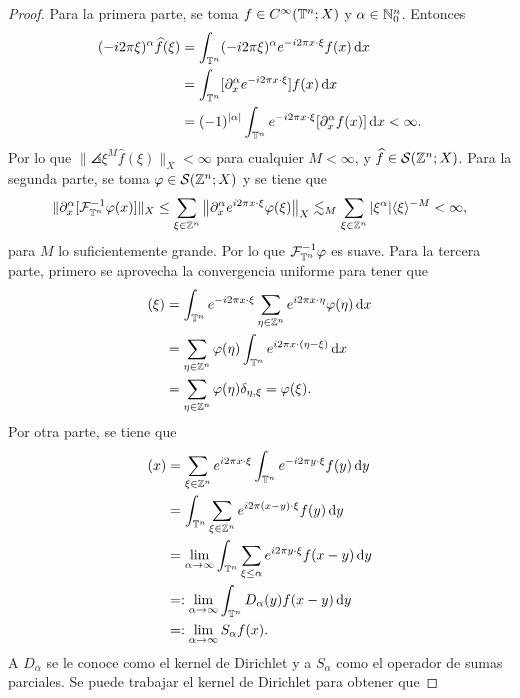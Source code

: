 \begin{proof}
	Para la primera parte, se toma $f\in C^\infty(\mathbb{T}^n;X)$ y $\alpha\in\mathbb{N}_0^n$. Entonces 
	\begin{align*}
		(-i2\pi\xi)^\alpha \widehat{f}(\xi) & =  \int_{\mathbb{T}^n}(-i2\pi\xi)^\alpha e^{-i2\pi x\cdot\xi} f(x) \mathop{}\!\mathrm{d} x \\ 
		& =  \int_{\mathbb{T}^n} [\partial^\alpha_xe^{-i2\pi x\cdot\xi} ]f(x) \mathop{}\!\mathrm{d} x\\
		& = (-1)^{|\alpha|}  \int_{\mathbb{T}^n} e^{-i2\pi x\cdot\xi} [\partial^\alpha_xf(x)] \mathop{}\!\mathrm{d} x < \infty.
	\end{align*}
	Por lo que $\|\angles{\xi}^M\widehat{f}(\xi)\|_X < \infty$ para cualquier $M<\infty$, y $\widehat{f}\in\mathcal{S}(\mathbb{Z}^n;X)$. Para la segunda parte, se toma $\varphi\in\mathcal{S}(\mathbb{Z}^n;X)$ y se tiene que 
	\begin{equation*}
		\|\partial^\alpha_x[\mathcal{F}_{\mathbb{T}^n}^{-1}\varphi(x)]\|_X \leq \sum_{\xi\in\mathbb{Z}^n}	\left\|   	\partial^\alpha_xe^{i2\pi x\cdot\xi} \varphi(\xi)
		\right\|_X \lesssim_M \sum_{\xi\in\mathbb{Z}^n} |\xi^\alpha| \langle\xi\rangle^{-M} < \infty,
	\end{equation*}
	 para $M$ lo suficientemente grande. Por lo que $\mathcal{F}_{\mathbb{T}^n}^{-1}\varphi$ es suave. Para la tercera parte, primero se aprovecha la convergencia uniforme para tener que 
	\begin{align*}
		[\mathcal{F}_{\T^n} (\mathcal{F}_{\T^n}^{-1}\varphi)](\xi) &=  \int_{\T^n} e^{-i2\pi x\cdot\xi} \sum_{\eta\in\Z^n} e^{i2\pi x\cdot\eta}\varphi(\eta) \diff x \\
		& =  \sum_{\eta\in\Z^n}\varphi(\eta) \int_{\T^n} e^{i2\pi x\cdot(\eta-\xi)} \diff x \\
		& = \sum_{\eta\in\Z^n}\varphi(\eta) \delta_{\eta,\xi} = \varphi(\xi).
	\end{align*}
	Por otra parte, se tiene que 
	\begin{align*}
		[\mathcal{F}_{\T^n}^{-1} (\mathcal{F}_{\T^n}f)](x)  & = \sum_{\xi\in\Z^n} e^{i2\pi x\cdot\xi} \int_{\T^n} e^{-i2\pi y\cdot\xi} f(y)\diff y \\
		& =  \int_{\T^n} \sum_{\xi\in\Z^n}e^{i2\pi (x-y)\cdot\xi} f(y)\diff y \\
		& = \lim_{\alpha\to\infty}  \int_{\T^n} \sum_{\xi\leq\alpha} e^{i2\pi y\cdot\xi} f(x-y)\diff y\\
		& =: \lim_{\alpha\to\infty}  \int_{\T^n} D_\alpha(y)f(x-y)\diff y \\
		&=: \lim_{\alpha\to\infty}  S_\alpha f(x).
	\end{align*}
	A $D_\alpha$ se le conoce como el kernel de Dirichlet y a $S_\alpha$ como el operador de sumas parciales. Se puede trabajar el kernel de Dirichlet para obtener que 

\end{proof}
